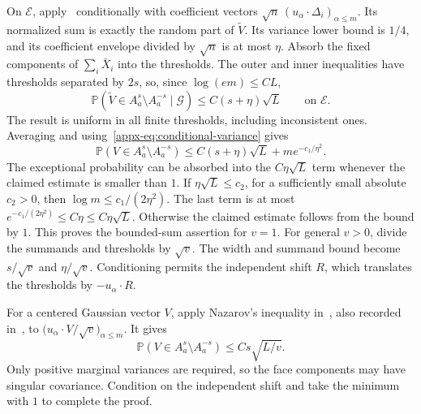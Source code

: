 \documentclass[11pt,letterpaper]{article}
\theoremstyle{remark}
\newcommand{\Pp}{\mathbb P}
\begin{document}
On \(\mathcal E\), apply~\cite[Lemma~J.4]{CCKK2022} conditionally
with coefficient vectors
\(\sqrt n\,(u_\alpha\cdot\Delta_i)_{\alpha\le m}\).
Its normalized sum is exactly the random part of \(\widetilde V\).
Its variance lower bound is \(1/4\), and its coefficient envelope
divided by \(\sqrt n\) is at most \(\eta\). Absorb the fixed
components of \(\sum_i\bar X_i\) into the thresholds. The outer and inner inequalities have thresholds
separated by \(2s\), so, since \(\log(em)\le CL\),
\[
 \Pp(\widetilde V\in A_a^s\setminus A_a^{-s}\mid\mathcal G)
 \le C(s+\eta)\sqrt L\qquad\text{on }\mathcal E.
\]
The result is uniform in all finite thresholds, including inconsistent
ones. Averaging and using~\eqref{appx-eq:conditional-variance} gives
\begin{equation}
 \Pp(V\in A_a^s\setminus A_a^{-s})
 \le C(s+\eta)\sqrt L+m e^{-c_1/\eta^2}.
 \label{appx-eq:concentration-pairs}
\end{equation}
The exceptional probability can be absorbed into the
\(C\eta\sqrt L\) term whenever the claimed estimate is smaller than \(1\). If \(\eta\sqrt L\le c_2\),
for a sufficiently small absolute
\(c_2>0\), then \(\log m\le c_1/(2\eta^2)\). The last term is
at most \(e^{-c_1/(2\eta^2)}\le C\eta\le C\eta\sqrt L\).
Otherwise the claimed estimate follows from the bound by \(1\).
This proves the bounded-sum assertion for \(v=1\).
For general \(v>0\), divide the summands and thresholds by
\(\sqrt v\). The width and summand bound become \(s/\sqrt v\)
and \(\eta/\sqrt v\). Conditioning permits the independent shift
\(R\), which translates the thresholds by \(-u_\alpha\cdot R\).

For a centered Gaussian vector \(V\), apply Nazarov's inequality
in~\cite[Lemma~A.1]{CCK2017}, also recorded
in~\cite[Lemma~J.3]{CCKK2022}, to
\(\bigl(u_\alpha\cdot V/\sqrt v\bigr)_{\alpha\le m}\). It gives
\[
 \Pp(V\in A_a^s\setminus A_a^{-s})\le Cs\sqrt{L/v}.
\]
Only positive marginal variances are required, so the face components
may have singular covariance. Condition on the independent shift
and take the minimum with \(1\) to complete the proof.
\end{document}
